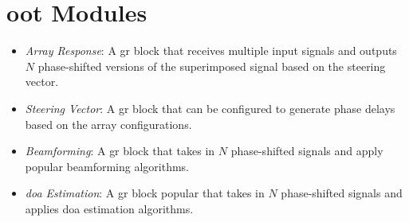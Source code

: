 \chapter{\acf{oot} Modules} \label{ch: oot-modules}

\begin{itemize}
	\item \textit{Array Response}: A \acs{gr} block that receives multiple input signals and outputs $N$ phase-shifted versions of the superimposed signal based on the steering vector.
	\item \textit{Steering Vector}: A \ac{gr} block that can be configured to generate phase delays based on the array configurations.
	\item \textit{Beamforming}: A \ac{gr} block that takes in $N$ phase-shifted signals and apply popular beamforming algorithms.
	\item \textit{\acs{doa} Estimation}: A \ac{gr} block  popular that takes in $N$ phase-shifted signals and applies \ac{doa} estimation algorithms.
\end{itemize}